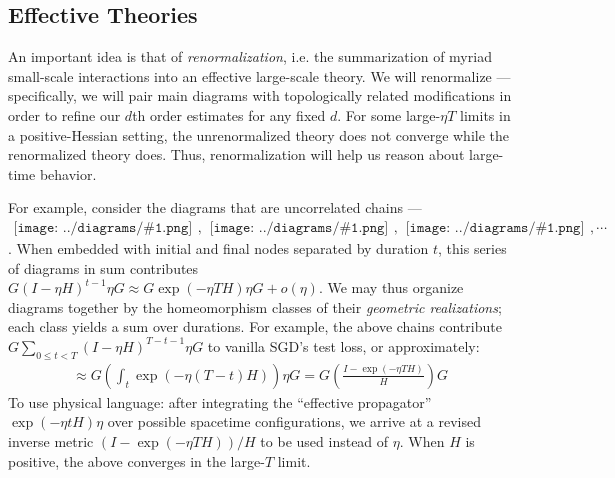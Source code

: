 \documentclass{article}
\newcommand{\wrap}[1]{\left(#1\right)}
\newcommand{\sdia}[1]{\begin{gathered}\texttt{[image: ../diagrams/\#1.png]}\end{gathered}}
\begin{document}

    \subsection{Effective Theories} \label{subsect:effective}
        An important idea is that of \emph{renormalization}, i.e. the
        summarization of myriad small-scale interactions into an effective
        large-scale theory.  We will renormalize --- specifically, we will
        pair main diagrams with topologically related modifications in order
        to refine our $d$th order estimates for any fixed $d$.  For
        some large-$\eta T$ limits in a positive-Hessian setting, the
        unrenormalized theory does not converge while the renormalized theory
        does.  Thus, renormalization will help us reason about large-time
        behavior. 

        For example, consider the diagrams that are uncorrelated chains ---
        $\sdia{(0-1)(01)}, \sdia{(0-1-2)(01-12)},
        \sdia{(0-1-2-3)(01-12-23)}, \cdots$.  When embedded with initial and
        final nodes separated by duration $t$, this series of diagrams in sum
        contributes
        $
            G (I-\eta H)^{t-1} \eta G
            \approx
            G \exp(-\eta T H) \eta G
            +
            o(\eta)
        $.
        We may thus organize diagrams together by the homeomorphism classes of
        their \emph{geometric realizations}; each class yields a sum over
        durations.  For example, the above chains contribute 
        $G \sum_{0\leq t<T} (I-\eta H)^{T-t-1} \eta G$
        to vanilla SGD's test loss, or approximately:
        \begin{align*}
            \approx
            G \wrap{\int_t \exp(-\eta (T-t) H)} \eta G
            =
            G \wrap{\frac{I - \exp(-\eta T H)}{H}} G
        \end{align*}
        To use physical language: after integrating the
        ``effective propagator'' $\exp(-\eta t H) \eta$ over possible
        spacetime configurations, we arrive at a revised inverse metric
        $
            \wrap{I - \exp(-\eta T H)}/H
        $
        to be used instead of $\eta$.  When $H$ is positive, the above
        converges in the large-$T$ limit.
\end{document}
